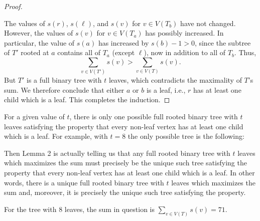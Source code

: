 \documentclass[12pt]{article}
\theoremstyle{definition}
\newcommand{\<}{\langle}
\renewcommand{\>}{\rangle}
\begin{document}
\begin{proof}
\begin{center}
    \end{center}
    The values of $s(r)$, $s(\ell)$, and $s(v)$ for $v \in V(T_b)$ have not changed.
    However, the values of $s(v)$ for $v \in V(T_a)$ has possibly increased.
    In particular, the value of $s(a)$ has increased by $s(b) - 1 > 0$, since the subtree of $T'$ rooted at $a$ contains all of $T_a$ (except $\ell$), now in addition to all of $T_b$.
    Thus,
    \[
        \sum_{v \in V(T')} s(v) > \sum_{v \in V(T)} s(v).
    \]
    But $T'$ is a full binary tree with $t$ leaves, which contradicts the maximality of $T$'s sum.
    We therefore conclude that either $a$ or $b$ is a leaf, i.e., $r$ has at least one child which is a leaf.
    This completes the induction.
\end{proof}

For a given value of $t$, there is only one possible full rooted binary tree with $t$ leaves satisfying the property that every non-leaf vertex has at least one child which is a leaf.
For example, with $t = 8$ the only possible tree is the following:
\begin{center}
\end{center}
Then Lemma 2 is actually telling us that any full rooted binary tree with $t$ leaves which maximizes the sum must precisely be the unique such tree satisfying the property that every non-leaf vertex has at least one child which is a leaf.
In other words, there is a unique full rooted binary tree with $t$ leaves which maximizes the sum and, moreover, it is precisely the unique such tree satisfying the property.

For the tree with $8$ leaves, the sum in question is $\sum_{v \in V(T)} s(v) = 71$.
\end{document}
